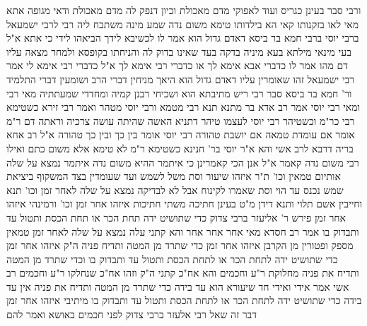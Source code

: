 \documentclass[12pt, openany]{book}
\begin{document}
{ורבי סבר  בעינן כגריס ועוד לאפוקי מדם מאכולת וכיון דנפק לה מדם מאכולת ודאי מגופה אתא 
מאי לאו בזקנותו קאי  הא בילדותו טימא משום נדה  שמע מינה 
משתבח ליה רבי לרבי ישמעאל ברבי יוסי ברבי חמא בר ביסא דאדם גדול הוא  אמר לו  לכשיבא לידך הביאהו לידי 
כי אתא א"ל  בעי מינאי מילתא  בעא מיניה  בדקה בעד שאינו בדוק לה והניחתו בקופסא ולמחר מצאה עליו דם מהו 
אמר לו  כדברי אבא אימא לך או כדברי רבי אימא לך  א"ל  כדברי רבי אימא לי 
אמר רבי ישמעאל  זהו שאומרין עליו דאדם גדול הוא  היאך מניחין דברי הרב ושומעין דברי התלמיד 
ור' חמא בר ביסא סבר  רבי ריש מתיבתא הוא ושכיחי רבנן קמיה ומחדדי שמעתתיה 
מאי רבי ומאי רבי יוסי  אמר רב אדא בר מתנא תנא  רבי מטמא ורבי יוסי מטהר 
ואמר רבי זירא  כשטימא רבי כר"מ וכשטיהר רבי יוסי לעצמו טיהר 
דתניא האשה שהיתה עושה צרכיה וראתה דם ר"מ אומר  אם עומדת טמאה אם יושבת טהורה 
רבי יוסי אומר  בין כך ובין כך טהורה 
א"ל רב אחא בריה דרבא לרב אשי  והא א"ר יוסי בר' חנינא  כשטימא ר"מ לא טימא אלא משום כתם ואילו רבי משום נדה קאמר  א"ל אנן הכי קאמרינן  כי איתמר ההיא משום נדה איתמר
נמצא על שלה אותיום טמאין וכו' ת"ר  איזהו שיעור וסת  משל לשמש ועד שעומדין בצד המשקוף ביציאת שמש נכנס עד
הוי  וסת שאמרו לקינוח אבל לא לבדיקה
נמצא על שלה לאחר זמן וכו' תנא  וחייבין אשם תלוי  ותנא דידן מ"ט 
בעינן חתיכה משתי חתיכות
איזהו אחר זמן וכו' ורמינהי איזהו אחר  זמן פירש ר' אליעזר ברבי צדוק  כדי שתושיט ידה תחת הכר או תחת הכסת ותטול עד ותבדוק בו 
אמר רב חסדא  מאי אחר אחר אחר 
והא קתני עלה נמצא על שלה לאחר זמן טמאין מספק ופטורין מן הקרבן  איזהו אחר זמן כדי שתרד מן המטה ותדיח פניה 
ה"ק  איזהו אחר זמן  כדי שתושיט ידה לתחת הכר או לתחת הכסת ותטול עד ותבדוק בו וכדי שתרד מן המטה ותדיח את פניה מחלוקת ר"ע וחכמים 
והא אח"כ קתני  ה"ק  וזהו אח"כ שנחלקו ר"ע וחכמים 
רב אשי אמר  אידי ואידי חד שיעורא הוא עד בידה כדי שתרד מן המטה ותדיח את פניה אין עד בידה כדי שתושיט ידה לתחת הכר או לתחת הכסת ותטול עד ותבדוק בו 
מיתיבי  איזהו אחר זמן  דבר זה שאל רבי אלעזר ברבי צדוק לפני חכמים באושא ואמר להם}
\end{document}
